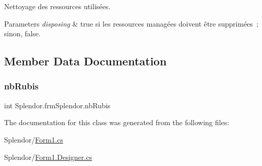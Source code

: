 Nettoyage des ressources utilisées. 


\begin{DoxyParams}{Parameters}
{\em disposing} & true si les ressources managées doivent être supprimées ; sinon, false.\\
\hline
\end{DoxyParams}


\subsection{Member Data Documentation}
\mbox{\label{class_splendor_1_1frm_splendor_a25670906523e1c2baec04410ed142d7c}} 
\subsubsection{\texorpdfstring{nb\+Rubis}{nbRubis}}
{\footnotesize\ttfamily int Splendor.\+frm\+Splendor.\+nb\+Rubis}



The documentation for this class was generated from the following files\+:\begin{DoxyCompactItemize}
\item 
Splendor/\hyperlink{_form1_8cs}{Form1.\+cs}\item 
Splendor/\hyperlink{_form1_8_designer_8cs}{Form1.\+Designer.\+cs}\end{DoxyCompactItemize}

